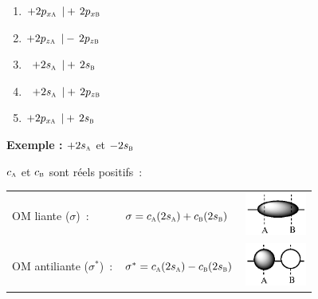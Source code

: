 \begin{minipage}{6cm}
\begin{enumerate}[\bf 1)]
\item $+2p_{x\textsc{a}}\ \, |+\,2p_{x\textsc{b}}$
\item $+2p_{z\textsc{a}}\ \, |-\,2p_{z\textsc{b}}$
\item $\ \, +2s_\textsc{a}\ \, |+\,2s_\textsc{b}$
\item $\ \, +2s_\textsc{a}\ \, |+\,2p_{z\textsc{b}}$
\item $+2p_{x\textsc{a}}\ \, |+\,2s_\textsc{b}$
\end{enumerate}
\end{minipage}%
%
\begin{minipage}{5cm}
\textbf{Exemple :}  $+2s_\textsc{a}$ et $-2s_\textsc{b}$

$c_\textsc{a}$ et $c_\textsc{b}$ sont r\'eels positifs~:

\begin{tabular}{lll}
OM liante ($\sigma$)~: &
$\sigma =  c_\textsc{a} (2s_\textsc{a}) + c_\textsc{b}(2s_\textsc{b})$ &
\includegraphics[width=2.0cm]{figure/sigma.eps} \\[0.5cm]
OM antiliante ($\sigma^*$)~: &
$\sigma^* = c_\textsc{a} (2s_\textsc{a}) - c_\textsc{b}(2s_\textsc{b})$ &
\includegraphics[width=2.0cm]{figure/sigma_star.eps} \\
\end{tabular}
\end{minipage}


